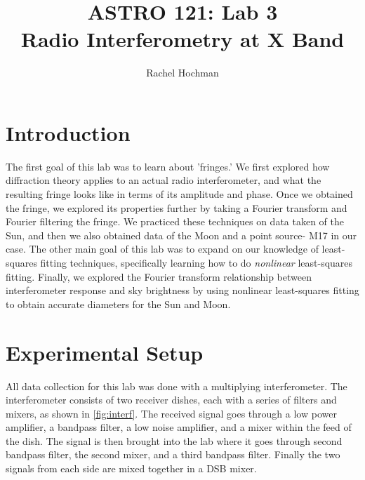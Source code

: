 \documentclass{article}
\begin{document}

\title{ASTRO 121: Lab 3  \\ \normalsize Radio Interferometry at X Band}

\author{Rachel Hochman}





\maketitle


\section{Introduction}

The first goal of this lab was to learn about 'fringes.' We first explored how diffraction theory applies to an actual radio interferometer, and what the resulting fringe looks like in terms of its amplitude and phase. Once we obtained the fringe, we explored its properties further by taking a Fourier transform and Fourier filtering the fringe. We practiced these techniques on data taken of the Sun, and then we also obtained data of the Moon and a point source- M17 in our case. The other main goal of this lab was to expand on our knowledge of least-squares fitting techniques, specifically learning how to do \textit{nonlinear} least-squares fitting. Finally, we explored the Fourier transform relationship between interferometer response and sky brightness by using nonlinear least-squares fitting to obtain accurate diameters for the Sun and Moon.

\section{Experimental Setup}

All data collection for this lab was done with a multiplying interferometer.  The interferometer consists of two receiver dishes, each with a series of filters and mixers, as shown in \autoref{fig:interf}.  The received signal goes through a low power amplifier, a bandpass filter, a low noise amplifier, and a mixer within the feed of the dish. The signal is then brought into the lab where it goes through second bandpass filter, the second mixer, and a third bandpass filter. Finally the two signals from each side are mixed together in a DSB mixer.
\end{document}
